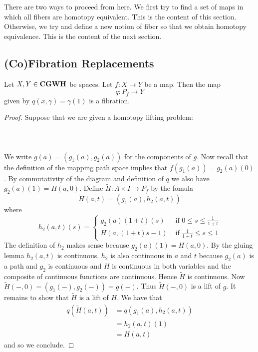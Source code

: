 \documentclass[a4paper]{article}
\begin{document}
There are two ways to proceed from here. We first try to find a set of maps in which all fibers are homotopy equivalent. This is the content of this section. Otherwise, we try and define a new notion of fiber so that we obtain homotopy equivalence. This is the content of the next section. 

\subsection{(Co)Fibration Replacements}
\begin{prp}{}{} Let $X,Y\in\bold{CGWH}$ be spaces. Let $f:X\to Y$ be a map. Then the map $$q:P_f\to Y$$ given by $q(x,\gamma)=\gamma(1)$ is a fibration. \tcbline
\begin{proof}
Suppose that we are given a homotopy lifting problem: \\~\\
\\~\\
We write $g(a)=(g_1(a),g_2(a))$ for the components of $g$. Now recall that the definition of the mapping path space implies that $f(g_1(a))=g_2(a)(0)$. By commutativity of the diagram and definition of $q$ we also have $g_2(a)(1)=H(a,0)$. Define $\tilde{H}:A\times I\to P_f$ by the fomula $$\tilde{H}(a,t)=(g_1(a),h_2(a,t))$$ where $$h_2(a,t)(s)=\begin{cases}
g_2(a)(1+t)(s) & \text{ if }0\leq s\leq\frac{1}{1+t}\\
H(a,(1+t)s-1) & \text{ if }\frac{1}{1+t}\leq s\leq 1
\end{cases}$$ The definition of $h_2$ makes sense because $g_2(a)(1)=H(a,0)$. By the gluing lemma $h_2(a,t)$ is continuous. $h_2$ is also continuous in $a$ and $t$ because $g_2(a)$ is a path and $g_2$ is continuous and $H$ is continuous in both variables and the composite of continuous functions are continuous. Hence $\tilde{H}$ is continuous. Now $\tilde{H}(-,0)=(g_1(-),g_2(-))=g(-)$. Thus $\tilde{H}(-,0)$ is a lift of $g$. It remains to show that $\tilde{H}$ is a lift of $H$. We have that 
\begin{align*}
q(\tilde{H}(a,t))&=q(g_1(a),h_2(a,t))\\
&=h_2(a,t)(1)\\
&=H(a,t)
\end{align*}
and so we conclude. 
\end{proof}
\end{prp}
\end{document}

